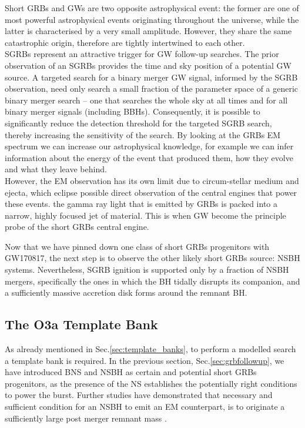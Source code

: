 \documentclass[binding=0.6cm, LaM]{sapthesis}
\begin{document}
	Short GRBs and GWs are two opposite astrophysical event:
	the former are one of most powerful astrophysical events originating throughout the universe,
	while the latter is characterised by a very small amplitude.
	However, they share the same catastrophic origin, 
	therefore are tightly intertwined to each other. \\
	SGRBs represent an attractive trigger for GW follow-up searches. 
	The prior observation of an SGRBs provides the time and sky position of a potential GW source. 
	A targeted search for a binary merger GW signal, 
	informed by the SGRB observation, need only search a small fraction of the parameter space
	of a generic binary merger search – one that searches the whole sky at all times and for all binary merger signals (including BBHs). 	
	Consequently, it is possible to significantly reduce the detection threshold for the targeted SGRB search,
	thereby increasing the sensitivity of the search.  
	By looking at the GRBs EM spectrum we can increase our astrophysical knowledge,
	for example we can infer information about the energy of the event that produced them,
	how they evolve and what they leave behind. \\
	However, the EM observation has its own limit due to circum-stellar medium and ejecta,
	which eclipse possible direct observation of the central engines that power these events.
	the gamma ray light that is emitted by GRBs is packed into a narrow, highly focused jet of material.
	This is when GW become the principle probe of the short GRBs central engine.
	
	Now that we have pinned down one class of short GRBs progenitors with GW170817, 
	the next step is to observe the other likely short GRBs source: NSBH systems.
	Nevertheless, SGRB ignition is supported only by a fraction of NSBH mergers,
	specifically the ones in which the BH tidally disrupts its companion, 
	and a sufficiently massive accretion disk forms around the remnant BH.

\subsection{The O3a Template Bank}
	As already mentioned in Sec.\ref{sec:template_banks}, to perform a modelled search 
	a template bank is required. 
	In the previous section, Sec.\ref{sec:grbfollowup}, we have introduced BNS and NSBH as certain and potential short GRBs progenitors,
	as the presence of the NS establishes the potentially right conditions to power the burst.
	Further studies have demonstrated that necessary and sufficient condition for an NSBH to emit an EM counterpart,
	is to originate a sufficiently large post merger remnant mass \cite{}.
	
\end{document}
